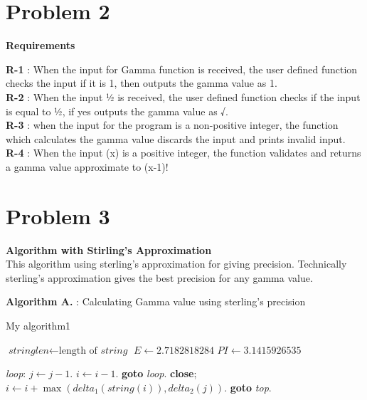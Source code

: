\documentclass[12pt]{report}
\begin{document}
\section{Problem 2}
\begin{center}
    

\begin{center}
    \textbf{Requirements}\large
\end{center}
\textbf{R-1} : When the input for Gamma function is received, the user defined function checks the input if it is 1, then outputs the gamma value as 1.\\
\textbf{R-2} : When the input ½ is received, the user defined function checks if the input is equal to ½, if yes outputs the gamma value as √\pi.\\


\textbf{R-3} : when the input for the program is a non-positive integer, the function which calculates the gamma value discards the input and prints invalid input.\\



\textbf{R-4} : When the input (x) is a positive integer, the function validates and returns a gamma value approximate to (x-1)!\\




\newpage
\section{Problem 3}
\textbf{Algorithm with Stirling’s Approximation}\\
This algorithm using sterling's approximation for giving precision. Technically sterling's approximation gives the best precision for any gamma value.

\textbf  {\large Algorithm A.{} }: Calculating Gamma value using sterling's precision\\

\begin{algorithm}
\caption{My algorithm1}\label{euclid}
\begin{algorithmic}[1]
\State $\textit{stringlen} \gets \text{length of }\textit{string}$
\State $E \gets \textit{2.7182818284}$
\State $PI \gets \textit{3.1415926535}$




\BState \emph{loop}:
\State $j \gets j-1$.
\State $i \gets i-1$.
\State \textbf{goto} \emph{loop}.
\State \textbf{close};
\EndIf
\State $i \gets i+\max(\textit{delta}_1(\textit{string}(i)),\textit{delta}_2(j))$.
\State \textbf{goto} \emph{top}.


\end{algorithmic}
\end{algorithm}
\end{center}
\end{document}

